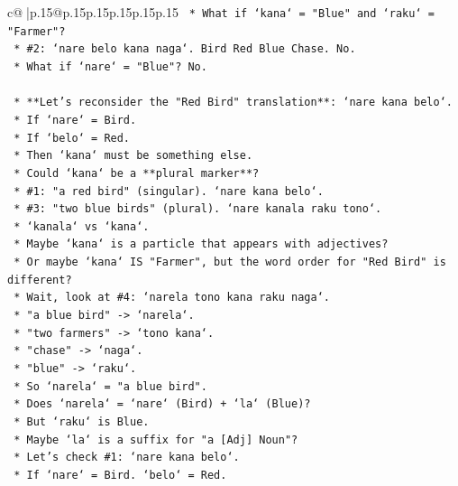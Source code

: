\documentclass{article}
\begin{document}
{\begin{supertabular}{c@{$\;$}|p{.15\linewidth}@{}p{.15\linewidth}p{.15\linewidth}p{.15\linewidth}p{.15\linewidth}p{.15\linewidth}}
{{{\texttt{                    *   What if `kana` = "Blue" and `raku` = "Farmer"?} \\
\texttt{                        *   \#2: `nare belo kana naga`. Bird Red Blue Chase. No.} \\
\texttt{                    *   What if `nare` = "Blue"? No.} \\
\\ 
\texttt{    *   **Let's reconsider the "Red Bird" translation**: `nare kana belo`.} \\
\texttt{        *   If `nare` = Bird.} \\
\texttt{        *   If `belo` = Red.} \\
\texttt{        *   Then `kana` must be something else.} \\
\texttt{        *   Could `kana` be a **plural marker**?} \\
\texttt{            *   \#1: "a red bird" (singular). `nare kana belo`.} \\
\texttt{            *   \#3: "two blue birds" (plural). `nare kanala raku tono`.} \\
\texttt{            *   `kanala` vs `kana`.} \\
\texttt{            *   Maybe `kana` is a particle that appears with adjectives?} \\
\texttt{            *   Or maybe `kana` IS "Farmer", but the word order for "Red Bird" is different?} \\
\texttt{            *   Wait, look at \#4: `narela tono kana raku naga`.} \\
\texttt{                *   "a blue bird" {-}> `narela`.} \\
\texttt{                *   "two farmers" {-}> `tono kana`.} \\
\texttt{                *   "chase" {-}> `naga`.} \\
\texttt{                *   "blue" {-}> `raku`.} \\
\texttt{                *   So `narela` = "a blue bird".} \\
\texttt{                *   Does `narela` = `nare` (Bird) + `la` (Blue)?} \\
\texttt{                *   But `raku` is Blue.} \\
\texttt{                *   Maybe `la` is a suffix for "a {[}Adj{]} Noun"?} \\
\texttt{                *   Let's check \#1: `nare kana belo`.} \\
\texttt{                    *   If `nare` = Bird. `belo` = Red.} \\
}}}
\end{supertabular}}
\end{document}
